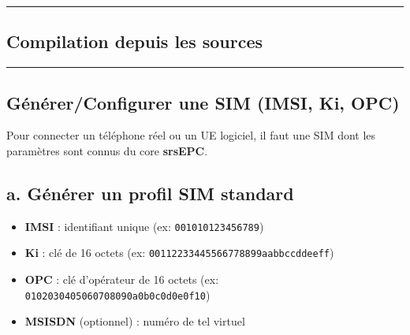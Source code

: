 \documentclass[
]{article}
\newenvironment{Shaded}{\begin{snugshade}}{\end{snugshade}}
\newcommand{\AttributeTok}[1]{\textcolor[rgb]{0.13,0.29,0.53}{#1}}
\newcommand{\BuiltInTok}[1]{#1}
\newcommand{\DataTypeTok}[1]{\textcolor[rgb]{0.13,0.29,0.53}{#1}}
\newcommand{\FunctionTok}[1]{\textcolor[rgb]{0.13,0.29,0.53}{\textbf{#1}}}
\newcommand{\KeywordTok}[1]{\textcolor[rgb]{0.13,0.29,0.53}{\textbf{#1}}}
\newcommand{\NormalTok}[1]{#1}
\newcommand{\VariableTok}[1]{\textcolor[rgb]{0.00,0.00,0.00}{#1}}
\providecommand{\tightlist}{%
  \setlength{\itemsep}{0pt}\setlength{\parskip}{0pt}}
\begin{document}
\begin{center}\rule{0.5\linewidth}{0.5pt}\end{center}

\subsection{Compilation depuis les
sources}\label{compilation-depuis-les-sources}

\begin{Shaded}
\end{Shaded}

\begin{center}\rule{0.5\linewidth}{0.5pt}\end{center}

\subsection{Générer/Configurer une SIM (IMSI, Ki,
OPC)}\label{guxe9nuxe9rerconfigurer-une-sim-imsi-ki-opc}

Pour connecter un téléphone réel ou un UE logiciel, il faut une SIM dont
les paramètres sont connus du core \textbf{srsEPC}.

\subsection{a. Générer un profil SIM
standard}\label{a.-guxe9nuxe9rer-un-profil-sim-standard}

\begin{itemize}
\tightlist
\item
  \textbf{IMSI} : identifiant unique (ex: \texttt{001010123456789})
\item
  \textbf{Ki} : clé de 16 octets (ex:
  \texttt{00112233445566778899aabbccddeeff})
\item
  \textbf{OPC} : clé d'opérateur de 16 octets (ex:
  \texttt{0102030405060708090a0b0c0d0e0f10})
\item
  \textbf{MSISDN} (optionnel) : numéro de tel virtuel
\end{itemize}
\end{document}
